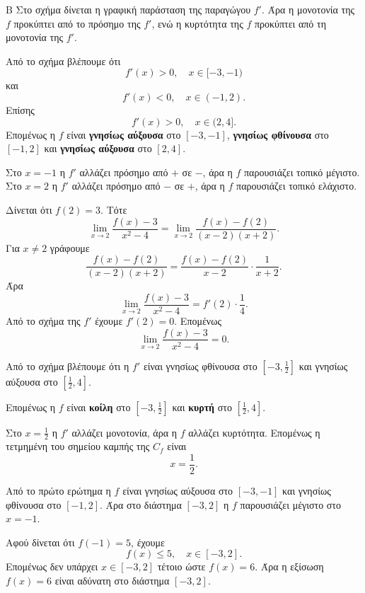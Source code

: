 

\begin{thema}{Β}
Στο σχήμα δίνεται η γραφική παράσταση της παραγώγου $f'$. Άρα η μονοτονία της $f$ προκύπτει από το πρόσημο της $f'$, ενώ η κυρτότητα της $f$ προκύπτει από τη μονοτονία της $f'$.

\begin{erwthma}
\item Από το σχήμα βλέπουμε ότι
\[
f'(x)>0,\quad x\in[-3,-1)
\]
και
\[
f'(x)<0,\quad x\in(-1,2).
\]
Επίσης
\[
f'(x)>0,\quad x\in(2,4].
\]
Επομένως η $f$ είναι \textbf{γνησίως αύξουσα} στο $[-3,-1]$, \textbf{γνησίως φθίνουσα} στο $[-1,2]$ και \textbf{γνησίως αύξουσα} στο $[2,4]$.

Στο $x=-1$ η $f'$ αλλάζει πρόσημο από $+$ σε $-$, άρα η $f$ παρουσιάζει τοπικό μέγιστο. Στο $x=2$ η $f'$ αλλάζει πρόσημο από $-$ σε $+$, άρα η $f$ παρουσιάζει τοπικό ελάχιστο.

\item Δίνεται ότι $f(2)=3$. Τότε
\[
\lim_{x\to 2}\frac{f(x)-3}{x^2-4}
=\lim_{x\to 2}\frac{f(x)-f(2)}{(x-2)(x+2)}.
\]
Για $x\neq 2$ γράφουμε
\[
\frac{f(x)-f(2)}{(x-2)(x+2)}
=\frac{f(x)-f(2)}{x-2}\cdot\frac{1}{x+2}.
\]
Άρα
\[
\lim_{x\to 2}\frac{f(x)-3}{x^2-4}
=f'(2)\cdot\frac{1}{4}.
\]
Από το σχήμα της $f'$ έχουμε $f'(2)=0$. Επομένως
\[
\lim_{x\to 2}\frac{f(x)-3}{x^2-4}=0.
\]

\item Από το σχήμα βλέπουμε ότι η $f'$ είναι γνησίως φθίνουσα στο $\left[-3,\frac{1}{2}\right]$ και γνησίως αύξουσα στο $\left[\frac{1}{2},4\right]$.

Επομένως η $f$ είναι \textbf{κοίλη} στο $\left[-3,\frac{1}{2}\right]$ και \textbf{κυρτή} στο $\left[\frac{1}{2},4\right]$.

Στο $x=\frac{1}{2}$ η $f'$ αλλάζει μονοτονία, άρα η $f$ αλλάζει κυρτότητα. Επομένως η τετμημένη του σημείου καμπής της $C_f$ είναι
\[
x=\frac{1}{2}.
\]

\item Από το πρώτο ερώτημα η $f$ είναι γνησίως αύξουσα στο $[-3,-1]$ και γνησίως φθίνουσα στο $[-1,2]$. Άρα στο διάστημα $[-3,2]$ η $f$ παρουσιάζει μέγιστο στο $x=-1$.

Αφού δίνεται ότι $f(-1)=5$, έχουμε
\[
f(x)\leq 5,\quad x\in[-3,2].
\]
Επομένως δεν υπάρχει $x\in[-3,2]$ τέτοιο ώστε $f(x)=6$. Άρα η εξίσωση $f(x)=6$ είναι αδύνατη στο διάστημα $[-3,2]$.
\end{erwthma}
\end{thema}

